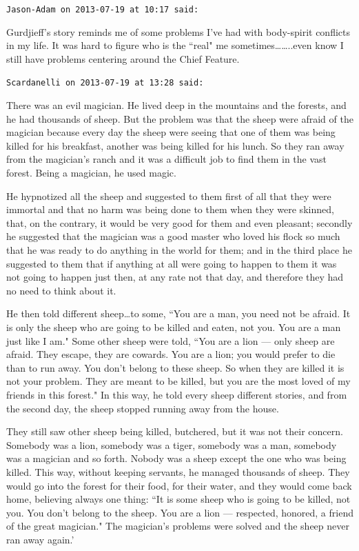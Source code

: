 \begin{footnotesize}\begin{sffamily}



\texttt{Jason-Adam on 2013-07-19 at 10:17 said: }

Gurdjieff's story reminds me of some problems I've had with body-spirit conflicts in my life. It was hard to figure who is the ``real" me sometimes……..even know I still have problems centering around the Chief Feature.


\hfill

\texttt{Scardanelli on 2013-07-19 at 13:28 said: }

There was an evil magician. He lived deep in the mountains and the forests, and he had thousands of sheep. But the problem was that the sheep were afraid of the magician because every day the sheep were seeing that one of them was being killed for his breakfast, another was being killed for his lunch. So they ran away from the magician's ranch and it was a difficult job to find them in the vast forest. Being a magician, he used magic.

He hypnotized all the sheep and suggested to them first of all that they were immortal and that no harm was being done to them when they were skinned, that, on the contrary, it would be very good for them and even pleasant; secondly he suggested that the magician was a good master who loved his flock so much that he was ready to do anything in the world for them; and in the third place he suggested to them that if anything at all were going to happen to them it was not going to happen just then, at any rate not that day, and therefore they had no need to think about it.

He then told different sheep…to some, ``You are a man, you need not be afraid. It is only the sheep who are going to be killed and eaten, not you. You are a man just like I am." Some other sheep were told, ``You are a lion — only sheep are afraid. They escape, they are cowards. You are a lion; you would prefer to die than to run away. You don't belong to these sheep. So when they are killed it is not your problem. They are meant to be killed, but you are the most loved of my friends in this forest." In this way, he told every sheep different stories, and from the second day, the sheep stopped running away from the house.

They still saw other sheep being killed, butchered, but it was not their concern. Somebody was a lion, somebody was a tiger, somebody was a man, somebody was a magician and so forth. Nobody was a sheep except the one who was being killed. This way, without keeping servants, he managed thousands of sheep. They would go into the forest for their food, for their water, and they would come back home, believing always one thing: ``It is some sheep who is going to be killed, not you. You don't belong to the sheep. You are a lion — respected, honored, a friend of the great magician." The magician's problems were solved and the sheep never ran away again.'



\end{sffamily}
\end{footnotesize}
